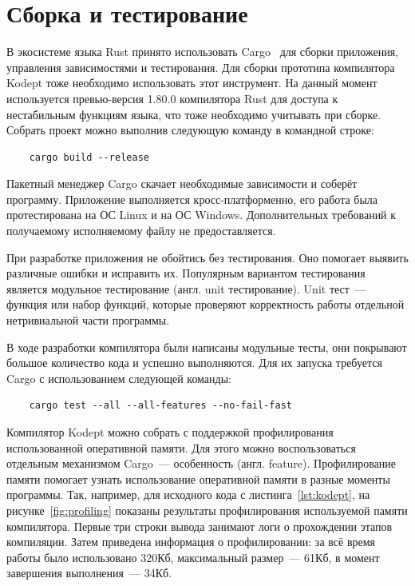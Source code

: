 \chapter{Сборка и тестирование}
\label{ch:chap4_soft_testing}

В экосистеме языка Rust принято использовать Cargo~\cite{CargoBook} для сборки приложения, управления зависимостями и тестирования.
Для сборки прототипа компилятора Kodept тоже необходимо использовать этот инструмент.
На данный момент используется превью-версия 1.80.0 компилятора Rust для доступа к нестабильным функциям языка, что тоже необходимо учитывать при сборке.
Собрать проект можно выполнив следующую команду в командной строке:

\begin{verbatim}
    cargo build --release
\end{verbatim}

Пакетный менеджер Cargo скачает необходимые зависимости и соберёт программу.
Приложение выполняется кросс-платформенно, его работа была протестирована на ОС Linux и на ОС Windows.
Дополнительных требований к получаемому исполняемому файлу не предоставляется.

При разработке приложения не обойтись без тестирования.
Оно помогает выявить различные ошибки и исправить их.
Популярным вариантом тестирования является модульное тестирование (англ. unit тестирование).
Unit тест~--- функция или набор функций, которые проверяют корректность работы отдельной нетривиальной части программы.

В ходе разработки компилятора были написаны модульные тесты, они покрывают большое количество кода и успешно выполняются.
Для их запуска требуется Cargo с использованием следующей команды:

\begin{verbatim}
    cargo test --all --all-features --no-fail-fast
\end{verbatim}

Компилятор Kodept можно собрать с поддержкой профилирования использованной оперативной памяти.
Для этого можно воспользоваться отдельным механизмом Cargo~--- особенность (англ. feature).
Профилирование памяти помогает узнать использование оперативной памяти в разные моменты программы.
Так, например, для исходного кода с листинга~\ref{lst:kodept}, на рисунке~\ref{fig:profiling} показаны результаты профилирования используемой памяти компилятора.
Первые три строки вывода занимают логи о прохождении этапов компиляции.
Затем приведена информация о профилировании: за всё время работы было использовано 320Кб, максимальный размер~--- 61Кб, в момент завершения выполнения~--- 34Кб.

